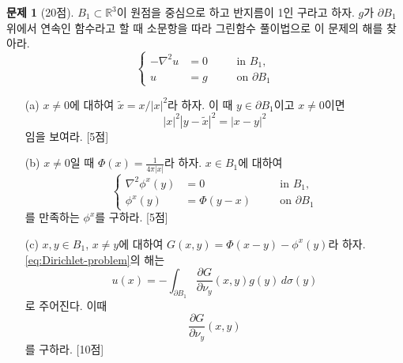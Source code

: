 \documentclass[b4paper,twocolumn]{oblivoir}
\theoremstyle{definition}
\newtheorem{problem}{문제}
\newcommand{\myd}[1]{\,d{#1}}
\begin{document}
\newpage 
\begin{problem}[20점]
$B_1\subset \mathbb{R}^3$이 원점을 중심으로 하고 반지름이 1인 구라고 하자. $g$가 $\partial B_1$위에서 연속인 함수라고 할 때 소문항을 따라 그린함수 풀이법으로 이 문제의 해를 찾아라.
\begin{equation}\label{eq:Dirichlet-problem}
    \left\{\begin{alignedat}{2}
        -\nabla^2u&=0 &&\quad \text{in }B_1,\\
        u&=g &&\quad \text{on }\partial B_1
    \end{alignedat}\right. 
\end{equation}
\end{problem}
\begin{enumerate}
    \item[(a)] $x\neq 0$에 대하여 $\tilde{x}=x/|x|^2$라 하자. 이 때 $y\in \partial B_1$이고 $x\neq 0$이면
        \[   |x|^2|y-\tilde{x}|^2=|x-y|^2  \]
        임을 보여라. [5점]\textheight
    \item[(b)] $x\neq 0$일 때 $\Phi(x)=\frac{1}{4\pi |x|}$라 하자. $x\in B_1$에 대하여
        \[   \left\{\begin{alignedat}{2}
                \nabla^2 \phi^x(y)&=0 &&\quad \text{in }B_1,\\
                \phi^x(y)&=\Phi(y-x) &&\quad \text{on }\partial B_1
            \end{alignedat}\right. \]
        를 만족하는 $\phi^x$를 구하라.  [5점]\newpage 
    \item[(c)] $x,y\in B_1$, $x\neq y$에 대하여 $G(x,y)=\Phi(x-y)-\phi^x(y)$라 하자. \eqref{eq:Dirichlet-problem}의 해는
        \[ u(x)=-\int_{\partial B_1} \frac{\partial G}{\partial \nu_y}(x,y)g(y)\myd{\sigma(y)}  \]
        로 주어진다. 이때 
        \[  \frac{\partial G}{\partial \nu_y}(x,y) \]
        를 구하라. [10점]
\end{enumerate}
\newpage
\end{document}
